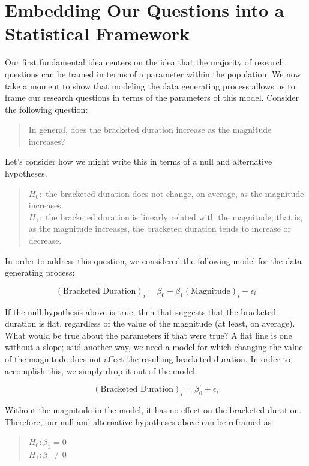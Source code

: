 \documentclass[]{book}
\theoremstyle{definition}
\theoremstyle{definition}
\theoremstyle{definition}
\theoremstyle{remark}
\begin{document}
\section{Embedding Our Questions into a Statistical
Framework}\label{embedding-our-questions-into-a-statistical-framework}

Our first fundamental idea centers on the idea that the majority of
research questions can be framed in terms of a parameter within the
population. We now take a moment to show that modeling the data
generating process allows us to frame our research questions in terms of
the parameters of this model. Consider the following question:

\begin{quote}
In general, does the bracketed duration increase as the magnitude
increases?
\end{quote}

Let's consider how we might write this in terms of a null and
alternative hypotheses.

\begin{quote}
\(H_0:\) the bracketed duration does not change, on average, as the
magnitude increases.\\
\(H_1:\) the bracketed duration is linearly related with the magnitude;
that is, as the magnitude increases, the bracketed duration tends to
increase or decrease.
\end{quote}

In order to address this question, we considered the following model for
the data generating process:

\[(\text{Bracketed Duration})_i = \beta_0 + \beta_1(\text{Magnitude})_i + \epsilon_i\]

If the null hypothesis above is true, then that suggests that the
bracketed duration is flat, regardless of the value of the magnitude (at
least, on average). What would be true about the parameters if that were
true? A flat line is one without a slope; said another way, we need a
model for which changing the value of the magnitude does not affect the
resulting bracketed duration. In order to accomplish this, we simply
drop it out of the model:

\[(\text{Bracketed Duration})_i = \beta_0 + \epsilon_i\]

Without the magnitude in the model, it has no effect on the bracketed
duration. Therefore, our null and alternative hypotheses above can be
reframed as

\begin{quote}
\(H_0: \beta_1 = 0\)\\
\(H_1: \beta_1 \neq 0\)
\end{quote}
\end{document}

